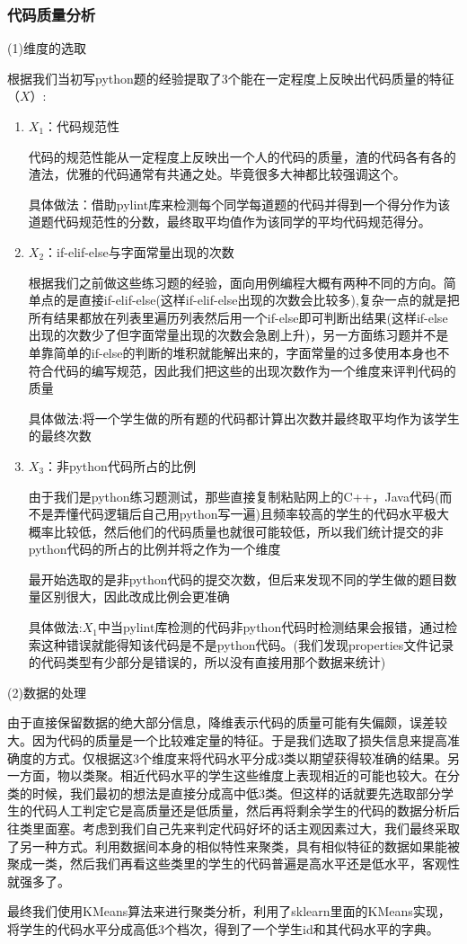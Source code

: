 \documentclass[UTF8]{ctexart}
\begin{document}
	\subsubsection{代码质量分析}
	\par (1)维度的选取
	\par 根据我们当初写python题的经验提取了3个能在一定程度上反映出代码质量的特征（$X$）:
	\par
	\begin{enumerate}
		\item $X_1$：代码规范性
		\par 代码的规范性能从一定程度上反映出一个人的代码的质量，渣的代码各有各的渣法，优雅的代码通常有共通之处。毕竟很多大神都比较强调这个。
		\par 具体做法：借助pylint库来检测每个同学每道题的代码并得到一个得分作为该道题代码规范性的分数，最终取平均值作为该同学的平均代码规范得分。
		\item $X_2$：if-elif-else与字面常量出现的次数
		\par 根据我们之前做这些练习题的经验，面向用例编程大概有两种不同的方向。简单点的是直接if-elif-else(这样if-elif-else出现的次数会比较多),复杂一点的就是把所有结果都放在列表里遍历列表然后用一个if-else即可判断出结果(这样if-else出现的次数少了但字面常量出现的次数会急剧上升)，另一方面练习题并不是单靠简单的if-else的判断的堆积就能解出来的，字面常量的过多使用本身也不符合代码的编写规范，因此我们把这些的出现次数作为一个维度来评判代码的质量
		\par 具体做法:将一个学生做的所有题的代码都计算出次数并最终取平均作为该学生的最终次数
		\item $X_3$：非python代码所占的比例
		\par 由于我们是python练习题测试，那些直接复制粘贴网上的C++，Java代码(而不是弄懂代码逻辑后自己用python写一遍)且频率较高的学生的代码水平极大概率比较低，然后他们的代码质量也就很可能较低，所以我们统计提交的非python代码的所占的比例并将之作为一个维度
		\par 最开始选取的是非python代码的提交次数，但后来发现不同的学生做的题目数量区别很大，因此改成比例会更准确
		\par 具体做法:$X_1$中当pylint库检测的代码非python代码时检测结果会报错，通过检索这种错误就能得知该代码是不是python代码。(我们发现properties文件记录的代码类型有少部分是错误的，所以没有直接用那个数据来统计)
	\end{enumerate}
	\par (2)数据的处理
	\par 由于直接保留数据的绝大部分信息，降维表示代码的质量可能有失偏颇，误差较大。因为代码的质量是一个比较难定量的特征。于是我们选取了损失信息来提高准确度的方式。仅根据这3个维度来将代码水平分成3类以期望获得较准确的结果。另一方面，物以类聚。相近代码水平的学生这些维度上表现相近的可能也较大。在分类的时候，我们最初的想法是直接分成高中低3类。但这样的话就要先选取部分学生的代码人工判定它是高质量还是低质量，然后再将剩余学生的代码的数据分析后往类里面塞。考虑到我们自己先来判定代码好坏的话主观因素过大，我们最终采取了另一种方式。利用数据间本身的相似特性来聚类，具有相似特征的数据如果能被聚成一类，然后我们再看这些类里的学生的代码普遍是高水平还是低水平，客观性就强多了。
	\par 最终我们使用KMeans算法来进行聚类分析，利用了sklearn里面的KMeans实现，将学生的代码水平分成高低3个档次，得到了一个学生id和其代码水平的字典。
	
\end{document}
